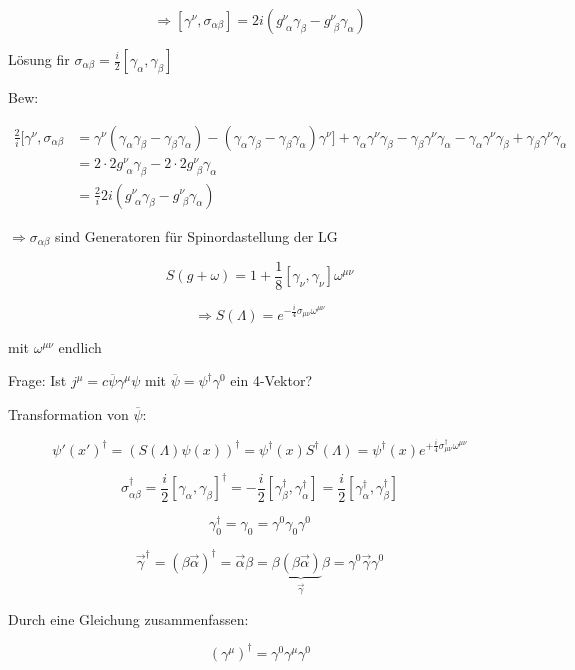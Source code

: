 \[\Rightarrow \boxed{[\gamma^\nu,\sigma_{\alpha\beta}] = 2i(g^{\nu}_{\,\,\alpha}\gamma_\beta -g^{\nu}_{\,\,\beta}\gamma_\alpha)  }\]


Lösung fir \(\sigma_{\alpha\beta} = \frac{i}{2}[\gamma_\alpha,\gamma_\beta]\)

Bew: 

\begin{align}
\frac{2}{i}[\gamma^\nu,\sigma_{\alpha\beta} &= \gamma^\nu(\gamma_\alpha\gamma_\beta - \gamma_\beta\gamma_\alpha)-(\gamma_\alpha\gamma_\beta-\gamma_\beta\gamma_\alpha)\gamma^\nu]+\gamma_\alpha\gamma^\nu\gamma_\beta - \gamma_\beta\gamma^\nu\gamma_\alpha-\gamma_\alpha\gamma^\nu\gamma_\beta + \gamma_\beta\gamma^\nu\gamma_\alpha \\
&= 2\cdot 2 g^\nu_{\,\,\alpha}\gamma_\beta - 2\cdot 2 g^\nu_{\,\,\beta}\gamma_\alpha \\
&= \frac{2}{i}2i(g^\nu_{\,\,\alpha}\gamma_\beta - g^\nu_{\,\,\beta}\gamma_\alpha)
 \end{align}

\(\Rightarrow \sigma_{\alpha\beta}\) sind Generatoren für Spinordastellung der LG

\[S(g+\omega) = 1+\frac{1}{8}[\gamma_\nu,\gamma_\nu]\omega^{\mu\nu}\]

\[\Rightarrow S(\Lambda) = e^{-\frac{i}{4}\sigma_{\mu\nu}\omega^{\mu\nu}}\]

mit \(\omega^{\mu\nu}\) endlich

Frage: Ist \(j^\mu = c\overline \psi \gamma^\mu \psi\) mit \(\overline\psi =\psi^\dagger\gamma^0\) ein 4-Vektor?


Transformation von \(\overline \psi\):

\[\psi'(x')^\dagger = (S(\Lambda)\psi(x))^\dagger = \psi^\dagger(x) S^\dagger(\Lambda) = \psi^\dagger(x)e^{+\frac{i}{4}\sigma^\dagger_{\mu\nu}\omega^{\mu\nu}}\]

\[\sigma^\dagger_{\alpha\beta} = \frac{i}{2}[\gamma_\alpha,\gamma_\beta]^\dagger = -\frac{i}{2} [\gamma_\beta^\dagger,\gamma_\alpha^\dagger] = \frac{i}{2}[\gamma_\alpha^\dagger,\gamma_\beta^\dagger] \]


\[\gamma^\dagger_0 = \gamma_0 = \gamma^0\gamma_0\gamma^0\]

\[\vec \gamma^\dagger = (\beta\vec\alpha)^\dagger = \vec\alpha\beta = \beta\underbrace{(\beta\vec\alpha)}_{\vec\gamma}\beta=\gamma^0\vec\gamma\gamma^0\]


Durch eine Gleichung zusammenfassen:

\[(\gamma^\mu)^\dagger = \gamma^0\gamma^\mu\gamma^0\]

